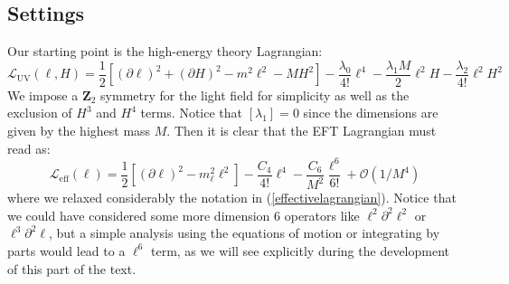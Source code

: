 \documentclass[11pt]{article}
\begin{document}
\subsection{Settings}
Our starting point is the high-energy theory Lagrangian:
\begin{equation}\label{toymodellagrangianuv}
    \mathcal{L}_{\text{UV}}(\ell,H)=\dfrac{1}{2}\left[(\partial \ell)^2+(\partial H)^2-m^2\ell^2-MH^2 \right]-\dfrac{\lambda_0}{4!}\ell^4-\dfrac{\lambda_1M}{2}\ell^2H-\dfrac{\lambda_2}{4!}\ell^2H^2
\end{equation}
We impose a $\mathbf{Z}_2$ symmetry for the light field for simplicity as well as the exclusion of $H^3$ and $H^4$ terms. Notice that $[\lambda_1]=0$ since the dimensions are given by the highest mass $M$. Then it is clear that the EFT Lagrangian must read as:
\begin{equation}\label{toymodelefflagrangian}
    \mathcal{L}_{\text{eff}}(\ell)=\dfrac{1}{2}\left[ (\partial \ell)^2-m_\ell^2\ell^2\right]-\dfrac{C_4}{4!}\ell^4-\dfrac{C_6}{M^2}\dfrac{\ell^6}{6!}+\mathcal{O}(1/M^4)
\end{equation}
where we relaxed considerably the notation in (\ref{effectivelagrangian}). Notice that we could have considered some more dimension $6$ operators like $\ell^2\partial^2\ell^2$ or $\ell^3\partial^2 \ell$, but a simple analysis using the equations of motion or integrating by parts would lead to a $\ell^6$ term, as we will see explicitly during the development of this part of the text.
\end{document}
